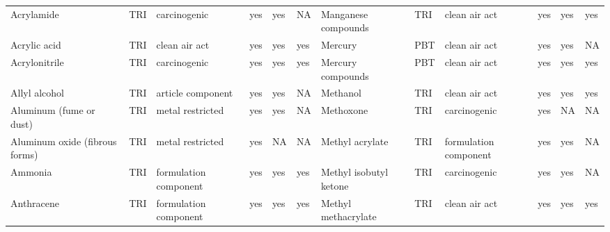 \begin{table}[H]
{\begin{tabular}{llllllllllll}
            Acrylamide                                                                 & TRI            & carcinogenic          & yes    & yes     & NA   & Manganese compounds                                                                                                & TRI            & clean air act         & yes & yes & yes\\
            Acrylic acid                                                               & TRI            & clean air act         & yes    & yes     & yes  & Mercury                                                                                                            & PBT            & clean air act         & yes    & yes     & NA   \\
            Acrylonitrile                                                              & TRI            & carcinogenic          & yes    & yes     & yes  & Mercury compounds                                                                                                  & PBT            & clean air act         & yes & yes & yes\\
            Allyl alcohol                                                              & TRI            & article component     & yes    & yes     & NA   & Methanol                                                                                                           & TRI            & clean air act         & yes    & yes & yes\\
            Aluminum (fume or dust)                                                    & TRI            & metal restricted      & yes    & yes     & NA   & Methoxone                                                                                                          & TRI            & carcinogenic & yes & NA & NA\\
            Aluminum oxide (fibrous forms)                                             & TRI            & metal restricted      & yes    & NA      & NA   & Methyl acrylate                                                                                                    & TRI & formulation component & yes & yes & NA\\
            Ammonia                                                                    & TRI            & formulation component & yes    & yes     & yes  & Methyl isobutyl ketone                                                                                             & TRI            & carcinogenic & yes & yes & NA\\
            Anthracene                                                                 & TRI            & formulation component & yes    & yes     & yes  & Methyl methacrylate                                                                                                & TRI            & clean air act & yes & yes & yes\\

\end{tabular}}
\end{table}
